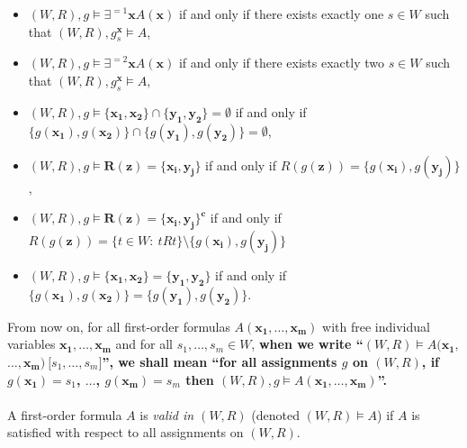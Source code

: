 \documentclass[draft]{article}
\begin{document}
\begin{itemize}
%
%
\item $(W,R),g{\models}\exists^{{=}1}\mathbf{x}A(\mathbf{x})$ if and only if there exists exactly one $s{\in}W$ such that $(W,R),g_{s}^{\mathbf{x}}{\models}A$,
%
%
\item $(W,R),g{\models}\exists^{{=}2}\mathbf{x}A(\mathbf{x})$ if and only if there exists exactly two $s{\in}W$ such that $(W,R),g_{s}^{\mathbf{x}}{\models}A$,
%
%
\item $(W,R),g{\models}\{\mathbf{x_{1}},\mathbf{x_{2}}\}{\cap}\{\mathbf{y_{1}},\mathbf{y_{2}}\}{=}\emptyset$ if and only if $\{g(\mathbf{x_{1}}),g(\mathbf{x_{2}})\}{\cap}\{g(\mathbf{y_{1}}),
%
%
%
%
%
%
%
%
%
%
%
%
$\linebreak$
%
%
%
%
%
%
%
%
%
%
%
%
g(\mathbf{y_{2}})\}{=}\emptyset$,
%
%
\item $(W,R),g{\models}\mathbf{R}(\mathbf{z}){=}\{\mathbf{x_{i}},\mathbf{y_{j}}\}$ if and only if $R(g(\mathbf{z})){=}\{g(\mathbf{x_{i}}),g(\mathbf{y_{j}})\}$,
%
%
\item $(W,R),g{\models}\mathbf{R}(\mathbf{z}){=}\{\mathbf{x_{i}},\mathbf{y_{j}}\}^{\mathbf{c}}$ if and only if $R(g(\mathbf{z})){=}\{t{\in}W:\ t{R}t\}{\setminus}\{g(\mathbf{x_{i}}),
%
%
%
%
%
%
%
%
%
%
%
%
$\linebreak$
%
%
%
%
%
%
%
%
%
%
%
%
g(\mathbf{y_{j}})\}$
%
%
\item $(W,R),g{\models}\{\mathbf{x_{1}},\mathbf{x_{2}}\}{=}\{\mathbf{y_{1}},\mathbf{y_{2}}\}$ if and only if $\{g(\mathbf{x_{1}}),g(\mathbf{x_{2}})\}{=}\{g(\mathbf{y_{1}}),
%
%
%
%
%
%
%
%
%
%
%
%
$\linebreak$
%
%
%
%
%
%
%
%
%
%
%
%
g(\mathbf{y_{2}})\}$.
%
%
\end{itemize}
%
%
From now on, for all first-order formulas $A(\mathbf{x_{1}},\ldots,\mathbf{x_{m}})$ with free individual variables $\mathbf{x_{1}},\ldots,\mathbf{x_{m}}$ and for all $s_{1},\ldots,s_{m}\in W$, {\bf when we write ``$(W,R){\models}A(\mathbf{x_{1}},
%
%
%
%
%
%
%
%
%
%
%
%
$\linebreak$
%
%
%
%
%
%
%
%
%
%
%
%
\ldots,\mathbf{x_{m}})\ \lbrack s_{1},\ldots,s_{m}\rbrack$'', we shall mean ``for all assignments $g$ on $(W,R)$, if $g(\mathbf{x_{1}}){=}s_{1}$, $\ldots$, $g(\mathbf{x_{m}}){=}s_{m}$ then $(W,R),g{\models}A(\mathbf{x_{1}},\ldots,\mathbf{x_{m}})$''.}
%
%
\\
\\
%
%
A first-order formula $A$ is {\it valid in $(W,R)$}\/ (denoted $(W,R){\models}A$) if $A$ is satisfied with respect to all assignments on $(W,R)$.
\end{document}
